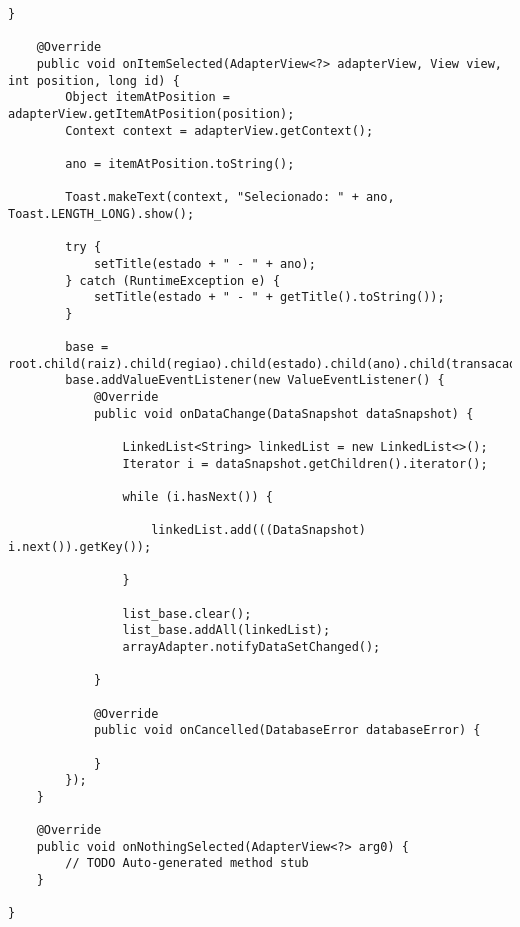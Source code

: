 \documentclass[12pt,a4paper]{article}
\begin{document}
\begin{lstlisting}[caption=./mobile/src/main/java/app/transparenciaeducativa/ListMunicipiosActivity.java]
    }

    @Override
    public void onItemSelected(AdapterView<?> adapterView, View view, int position, long id) {
        Object itemAtPosition = adapterView.getItemAtPosition(position);
        Context context = adapterView.getContext();

        ano = itemAtPosition.toString();

        Toast.makeText(context, "Selecionado: " + ano, Toast.LENGTH_LONG).show();

        try {
            setTitle(estado + " - " + ano);
        } catch (RuntimeException e) {
            setTitle(estado + " - " + getTitle().toString());
        }

        base = root.child(raiz).child(regiao).child(estado).child(ano).child(transacao);
        base.addValueEventListener(new ValueEventListener() {
            @Override
            public void onDataChange(DataSnapshot dataSnapshot) {

                LinkedList<String> linkedList = new LinkedList<>();
                Iterator i = dataSnapshot.getChildren().iterator();

                while (i.hasNext()) {

                    linkedList.add(((DataSnapshot) i.next()).getKey());

                }

                list_base.clear();
                list_base.addAll(linkedList);
                arrayAdapter.notifyDataSetChanged();

            }

            @Override
            public void onCancelled(DatabaseError databaseError) {

            }
        });
    }

    @Override
    public void onNothingSelected(AdapterView<?> arg0) {
        // TODO Auto-generated method stub
    }

}
\end{lstlisting}
\pagebreak
\end{document}
